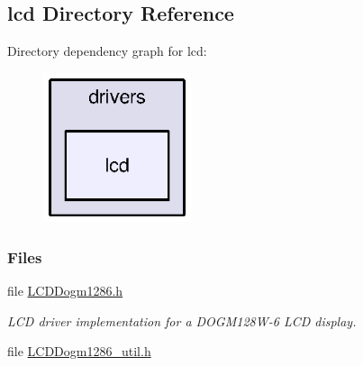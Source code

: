 \subsection{lcd Directory Reference}
\label{dir_33166de4d01126f67f0d3f22ed870d72}
Directory dependency graph for lcd\+:
\nopagebreak
\begin{figure}[H]
\begin{center}
\leavevmode
\includegraphics[width=123pt]{dir_33166de4d01126f67f0d3f22ed870d72_dep}
\end{center}
\end{figure}
\subsubsection*{Files}
\begin{DoxyCompactItemize}
\item 
file \hyperlink{_l_c_d_dogm1286_8h}{L\+C\+D\+Dogm1286.\+h}
\begin{DoxyCompactList}\small\item\em L\+C\+D driver implementation for a D\+O\+G\+M128\+W-\/6 L\+C\+D display. \end{DoxyCompactList}\item 
file \hyperlink{_l_c_d_dogm1286__util_8h}{L\+C\+D\+Dogm1286\+\_\+util.\+h}
\end{DoxyCompactItemize}
